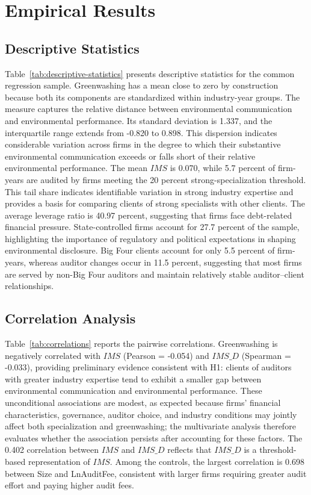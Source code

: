 \documentclass[11pt]{article}
\begin{document}
\section{Empirical Results}

\subsection{Descriptive Statistics}

Table~\ref{tab:descriptive-statistics} presents descriptive statistics for the common regression sample. 
Greenwashing has a mean close to zero by construction because both its components are standardized within industry-year groups. 
The measure captures the relative distance between environmental communication and environmental performance. 
Its standard deviation is 1.337, and the interquartile range extends from -0.820 to 0.898. 
This dispersion indicates considerable variation across firms in the degree to which their substantive environmental communication exceeds or falls short of their relative environmental performance.
The mean \(IMS\) is 0.070, while 5.7 percent of firm-years are audited by firms meeting the 20 percent strong-specialization threshold. 
This tail share indicates identifiable variation in strong industry expertise and provides a basis for comparing clients of strong specialists with other clients.
The average leverage ratio is 40.97 percent, suggesting that firms face debt-related financial pressure.
State-controlled firms account for 27.7 percent of the sample, highlighting the importance of regulatory and political expectations in shaping environmental disclosure. 
Big Four clients account for only 5.5 percent of firm-years, whereas auditor changes occur in 11.5 percent, suggesting that most firms are served by non-Big Four auditors and maintain relatively stable auditor–client relationships.

\subsection{Correlation Analysis}

Table~\ref{tab:correlations} reports the pairwise correlations. 
Greenwashing is negatively correlated with \(IMS\) (Pearson = -0.054) and \(IMS\_D\) (Spearman = -0.033), providing preliminary evidence consistent with H1: clients of auditors with greater industry expertise tend to exhibit a smaller gap between environmental communication and environmental performance. 
These unconditional associations are modest, as expected because firms' financial characteristics, governance, auditor choice, and industry conditions may jointly affect both specialization and greenwashing; the multivariate analysis therefore evaluates whether the association persists after accounting for these factors. 
The 0.402 correlation between \(IMS\) and \(IMS\_D\) reflects that \(IMS\_D\) is a threshold-based representation of \(IMS\). 
Among the controls, the largest correlation is 0.698 between Size and LnAuditFee, consistent with larger firms requiring greater audit effort and paying higher audit fees.
\end{document}

